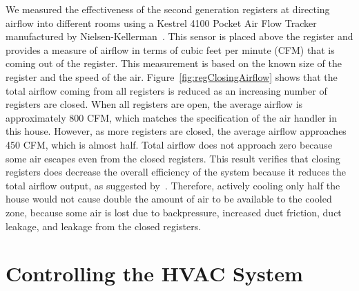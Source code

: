 We measured the effectiveness of the second generation registers at directing
airflow into different rooms using a Kestrel 4100 Pocket Air Flow Tracker
manufactured by Nielsen-Kellerman~\cite{kestrel}. This sensor is placed above
the register and provides a measure of airflow in terms of cubic feet per minute
(CFM) that is coming out of the register.  This measurement is based on the
known size of the register and the speed of the air.
Figure~\ref{fig:regClosingAirflow} shows that the total airflow coming from all
registers is reduced as an increasing number of registers are closed.  When all
registers are open, the average airflow is approximately 800 CFM, which matches
the specification of the air handler in this house.  However, as more registers
are closed, the average airflow approaches 450 CFM, which is almost half. Total
airflow does not approach zero because some air escapes even from the closed
registers.  This result verifies that closing registers does decrease the
overall efficiency of the system because it reduces the total airflow output, as
suggested by~\cite{walker2003register}.  Therefore, actively cooling only half
the house would not cause double the amount of air to be available to the cooled
zone, because some air is lost due to backpressure, increased duct friction,
duct leakage, and leakage from the closed registers.


\section{Controlling the HVAC System}
\label{sec:controllingHVAC}
